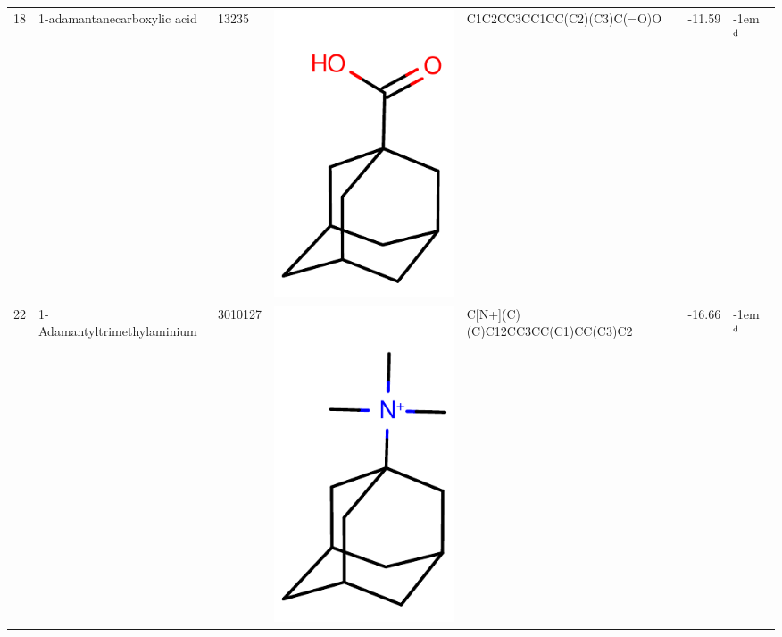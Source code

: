 \documentclass[aps,pre,twocolumn,nofootinbib,superscriptaddress,10pt, final,tightenlines]{revtex4-1}
\begin{document}
\begin{table}
\begin{tabular}{lllp{1.5cm}>{\ttfamily}lS[table-format=-1.2, table-figures-uncertainty=1]l}
18 & 1-adamantanecarboxylic acid        & 13235     & \parbox[c]{1em}{\includegraphics[scale=0.2]{figures/13235.pdf}}     & C1C2CC3CC1CC(C2)(C3)C(=O)O                   & -11.59  & \kern-1em {$^{\rm d}$}  \\
22 & 1-Adamantyltrimethylaminium        & 3010127   & \parbox[c]{1em}{\includegraphics[scale=0.2]{figures/3010127.pdf}}   & C[N+](C)(C)C12CC3CC(C1)CC(C3)C2              & -16.66  & \kern-1em {$^{\rm d}$}  \\

\end{tabular}
\end{table}
\end{document}
